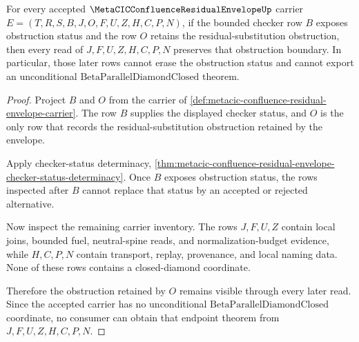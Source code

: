 \begin{theorem}
\label{thm:metacic-residual-envelope-obstruction-monotonicity}
For every accepted $\MetaCICConfluenceResidualEnvelopeUp$ carrier $E=(T,R,S,B,J,O,F,U,Z,H,C,P,N)$, if the bounded checker row $B$ exposes obstruction status and the row $O$ retains the residual-substitution obstruction, then every read of $J,F,U,Z,H,C,P,N$ preserves that obstruction boundary. In particular, those later rows cannot erase the obstruction status and cannot export an unconditional $\mathrm{BetaParallelDiamondClosed}$ theorem.
\end{theorem}
\begin{proof}
Project $B$ and $O$ from the carrier of \autoref{def:metacic-confluence-residual-envelope-carrier}. The row $B$ supplies the displayed checker status, and $O$ is the only row that records the residual-substitution obstruction retained by the envelope.

Apply checker-status determinacy, \autoref{thm:metacic-confluence-residual-envelope-checker-status-determinacy}. Once $B$ exposes obstruction status, the rows inspected after $B$ cannot replace that status by an accepted or rejected alternative.

Now inspect the remaining carrier inventory. The rows $J,F,U,Z$ contain local joins, bounded fuel, neutral-spine reads, and normalization-budget evidence, while $H,C,P,N$ contain transport, replay, provenance, and local naming data. None of these rows contains a closed-diamond coordinate.

Therefore the obstruction retained by $O$ remains visible through every later read. Since the accepted carrier has no unconditional $\mathrm{BetaParallelDiamondClosed}$ coordinate, no consumer can obtain that endpoint theorem from $J,F,U,Z,H,C,P,N$.
\end{proof}

